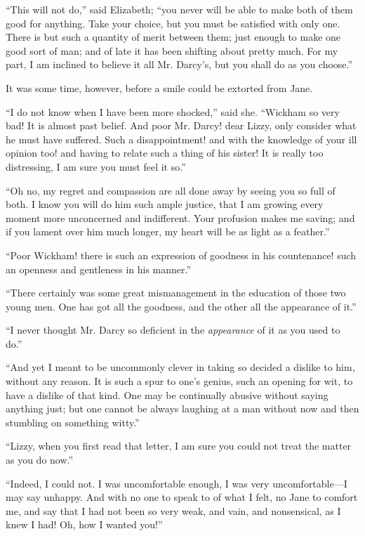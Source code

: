 \documentclass[12pt,openright]{book}
\begin{document}
“This will not do,” said Elizabeth; “you never will be able to make both of them good for anything. Take your choice, but you must be satisfied with only one. There is but such a quantity of merit between them; just enough to make one good sort of man; and of late it has been shifting about pretty much. For my part, I am inclined to believe it all Mr. Darcy’s, but you shall do as you choose.”

It was some time, however, before a smile could be extorted from Jane.

“I do not know when I have been more shocked,” said she. “Wickham so very bad! It is almost past belief. And poor Mr. Darcy! dear Lizzy, only consider what he must have suffered. Such a disappointment! and with the knowledge of your ill opinion too! and having to relate such a thing of his sister! It is really too distressing, I am sure you must feel it so.”

“Oh no, my regret and compassion are all done away by seeing you so full of both. I know you will do him such ample justice, that I am growing every moment more unconcerned and indifferent. Your profusion makes me saving; and if you lament over him much longer, my heart will be as light as a feather.”

“Poor Wickham! there is such an expression of goodness in his countenance! such an openness and gentleness in his manner.”

“There certainly was some great mismanagement in the education of those two young men. One has got all the goodness, and the other all the appearance of it.”

“I never thought Mr. Darcy so deficient in the \textit{appearance} of it as you used to do.”

“And yet I meant to be uncommonly clever in taking so decided a dislike to him, without any reason. It is such a spur to one’s genius, such an opening for wit, to have a dislike of that kind. One may be continually abusive without saying anything just; but one cannot be always laughing at a man without now and then stumbling on something witty.”

“Lizzy, when you first read that letter, I am sure you could not treat the matter as you do now.”

“Indeed, I could not. I was uncomfortable enough, I was very uncomfortable—I may say unhappy. And with no one to speak to of what I felt, no Jane to comfort me, and say that I had not been so very weak, and vain, and nonsensical, as I knew I had! Oh, how I wanted you!”
\end{document}
